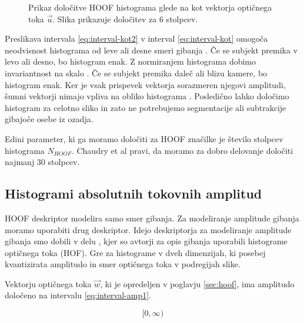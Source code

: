 \begin{figure}[htb]
\centering

\caption[Prikaz določitve HOOF histograma glede na kot vektorja]{Prikaz določitve HOOF histograma glede na kot vektorja optičnega toka $\vec{u}$. Slika prikazuje določitev za $6$ stolpcev.}
\label{fig:hoof-histogram}
\end{figure}




Preslikava intervala \eqref{eq:interval-kot2} v interval \eqref{eq:interval-kot} omogoča neodvisnost histograma od leve ali desne smeri gibanja \cite{chaudhry2009histograms}. Če se subjekt premika v levo ali desno, bo histogram enak. Z normiranjem histograma dobimo invariantnost na skalo \cite{chaudhry2009histograms}. Če se subjekt premika daleč ali blizu kamere, bo histogram enak. Ker je vsak prispevek vektorja sorazmeren njegovi amplitudi, šumni vektorji nimajo vpliva na obliko histograma \cite{chaudhry2009histograms}. Posledično lahko določimo histogram za celotno sliko in zato ne potrebujemo segmentacije ali subtrakcije gibajoče osebe iz ozadja. 

Edini parameter, ki ga moramo določiti za HOOF značilke je število stolpcev histograma $N_{HOOF}$. Chaudry et al \cite{chaudhry2009histograms} pravi, da moramo za dobro delovanje določiti najmanj $30$ stolpcev. 










\subsection{Histogrami absolutnih tokovnih amplitud}\label{sec:hafa}
HOOF deskriptor modelira samo smer gibanja. Za modeliranje amplitude gibanja moramo uporabiti drug deskriptor. Idejo deskriptorja za modeliranje amplitude gibanja smo dobili v delu \cite{pers2010histograms}, kjer so avtorji za opis gibanja uporabili histograme optičnega toka (HOF). Gre za histograme v dveh dimenzijah, ki posebej kvantizirata amplitudo in smer optičnega toka v podregijah slike. 

Vektorju optičnega toka $\vec{w}$, ki je opredeljen v poglavju \ref{sec:hoof}, ima amplitudo določeno na intervalu \eqref{eq:interval-amp1}. 

\begin{equation}\label{eq:interval-amp1}
	[0, \infty)
\end{equation}


